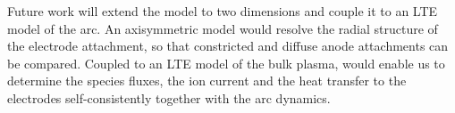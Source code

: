 Future work will extend the model to two dimensions and couple it to an LTE model of the arc. An axisymmetric model would resolve the radial structure of the electrode attachment, so that constricted and diffuse anode attachments can be compared. Coupled to an LTE model of the bulk plasma, would enable us to determine the species fluxes, the ion current and the heat transfer to the electrodes self-consistently together with the arc dynamics.


